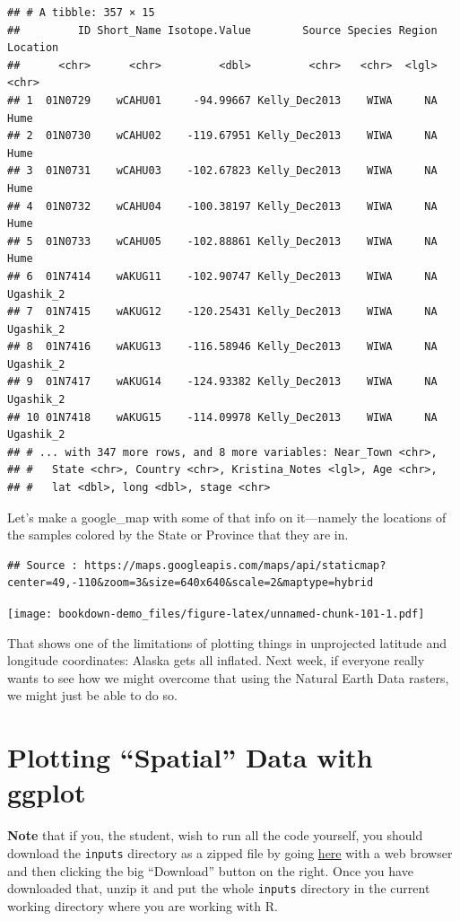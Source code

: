 \documentclass[]{book}
\theoremstyle{definition}
\theoremstyle{definition}
\theoremstyle{remark}
\begin{document}
\begin{verbatim}
## # A tibble: 357 × 15
##         ID Short_Name Isotope.Value        Source Species Region  Location
##      <chr>      <chr>         <dbl>         <chr>   <chr>  <lgl>     <chr>
## 1  01N0729    wCAHU01     -94.99667 Kelly_Dec2013    WIWA     NA      Hume
## 2  01N0730    wCAHU02    -119.67951 Kelly_Dec2013    WIWA     NA      Hume
## 3  01N0731    wCAHU03    -102.67823 Kelly_Dec2013    WIWA     NA      Hume
## 4  01N0732    wCAHU04    -100.38197 Kelly_Dec2013    WIWA     NA      Hume
## 5  01N0733    wCAHU05    -102.88861 Kelly_Dec2013    WIWA     NA      Hume
## 6  01N7414    wAKUG11    -102.90747 Kelly_Dec2013    WIWA     NA Ugashik_2
## 7  01N7415    wAKUG12    -120.25431 Kelly_Dec2013    WIWA     NA Ugashik_2
## 8  01N7416    wAKUG13    -116.58946 Kelly_Dec2013    WIWA     NA Ugashik_2
## 9  01N7417    wAKUG14    -124.93382 Kelly_Dec2013    WIWA     NA Ugashik_2
## 10 01N7418    wAKUG15    -114.09978 Kelly_Dec2013    WIWA     NA Ugashik_2
## # ... with 347 more rows, and 8 more variables: Near_Town <chr>,
## #   State <chr>, Country <chr>, Kristina_Notes <lgl>, Age <chr>,
## #   lat <dbl>, long <dbl>, stage <chr>
\end{verbatim}

Let's make a google\_map with some of that info on it---namely the
locations of the samples colored by the State or Province that they are
in.

\begin{verbatim}
## Source : https://maps.googleapis.com/maps/api/staticmap?center=49,-110&zoom=3&size=640x640&scale=2&maptype=hybrid
\end{verbatim}

\texttt{[image: bookdown-demo\_files/figure-latex/unnamed-chunk-101-1.pdf]}

That shows one of the limitations of plotting things in unprojected
latitude and longitude coordinates: Alaska gets all inflated. Next week,
if everyone really wants to see how we might overcome that using the
Natural Earth Data rasters, we might just be able to do so.

\chapter{\texorpdfstring{Plotting ``Spatial'' Data with
ggplot}{Plotting Spatial Data with ggplot}}\label{plotting-spatial-data-with-ggplot}

\textbf{Note} that if you, the student, wish to run all the code
yourself, you should download the \texttt{inputs} directory as a zipped
file by going
\href{https://github.com/eriqande/rep-res-eeb-2017/blob/master/inputs.zip}{here}
with a web browser and then clicking the big ``Download'' button on the
right. Once you have downloaded that, unzip it and put the whole
\texttt{inputs} directory in the current working directory where you are
working with R.
\end{document}
